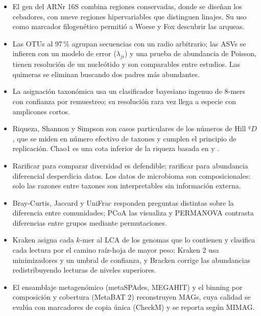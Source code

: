\begin{resumen}
\begin{itemize}
  \item El gen del ARNr 16S combina regiones conservadas, donde se diseñan los cebadores, con nueve regiones hipervariables que distinguen linajes. Su uso como marcador filogenético permitió a Woese y Fox descubrir las arqueas.
  \item Las OTUs al 97\,\% agrupan secuencias con un radio arbitrario; las ASVs se infieren con un modelo de error ($\lambda_{ji}$) y una prueba de abundancia de Poisson, tienen resolución de un nucleótido y son comparables entre estudios. Las quimeras se eliminan buscando dos padres más abundantes.
  \item La asignación taxonómica usa un clasificador bayesiano ingenuo de 8-mers con confianza por remuestreo; su resolución rara vez llega a especie con amplicones cortos.
  \item Riqueza, Shannon y Simpson son casos particulares de los números de Hill ${}^qD$, que se miden en número efectivo de taxones y cumplen el principio de replicación. Chao1 es una cota inferior de la riqueza basada en  y .
  \item Rarificar para comparar diversidad es defendible; rarificar para abundancia diferencial desperdicia datos. Los datos de microbioma son composicionales: solo las razones entre taxones son interpretables sin información externa.
  \item Bray-Curtis, Jaccard y UniFrac responden preguntas distintas sobre la diferencia entre comunidades; PCoA las visualiza y PERMANOVA contrasta diferencias entre grupos mediante permutaciones.
  \item Kraken asigna cada $k$-mer al LCA de los genomas que lo contienen y clasifica cada lectura por el camino raíz-hoja de mayor peso; Kraken 2 usa minimizadores y un umbral de confianza, y Bracken corrige las abundancias redistribuyendo lecturas de niveles superiores.
  \item El ensamblaje metagenómico (metaSPAdes, MEGAHIT) y el binning por composición y cobertura (MetaBAT 2) reconstruyen MAGs, cuya calidad se evalúa con marcadores de copia única (CheckM) y se reporta según MIMAG.
\end{itemize}
\end{resumen}

